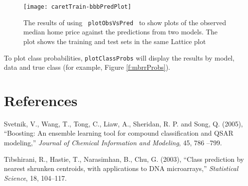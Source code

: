 \documentclass[12pt]{article}
\begin{document}
\begin{figure}
   \begin{center}      
\texttt{[image: caretTrain-bbbPredPlot]}
      \caption{The results of using \texttt{ plotObsVsPred } to show plots of the observed median home price against the predictions from two models. The plot shows the training and test sets in the same Lattice plot}
      \label{f:bbbPredPlot}         
   \end{center}
\end{figure}


To plot class probabilities, \texttt{plotClassProbs} will display the results by model, data and true class (for example, Figure \ref{f:mbrrProbs}).     

\section{References}

\begin{description}
   \item Svetnik, V., Wang, T., Tong, C., Liaw, A., Sheridan, R. P. and Song, Q. (2005), ``Boosting: An ensemble learning tool for compound classification and QSAR modeling,'' {\it Journal of Chemical Information and Modeling}, 45, 786 --799.
   
   \item Tibshirani, R., Hastie, T., Narasimhan, B., Chu, G. (2003), ``Class prediction by nearest shrunken centroids, with applications to DNA microarrays,'' {\it  Statistical Science}, 18, 104--117.


\end{description}
\end{document}
